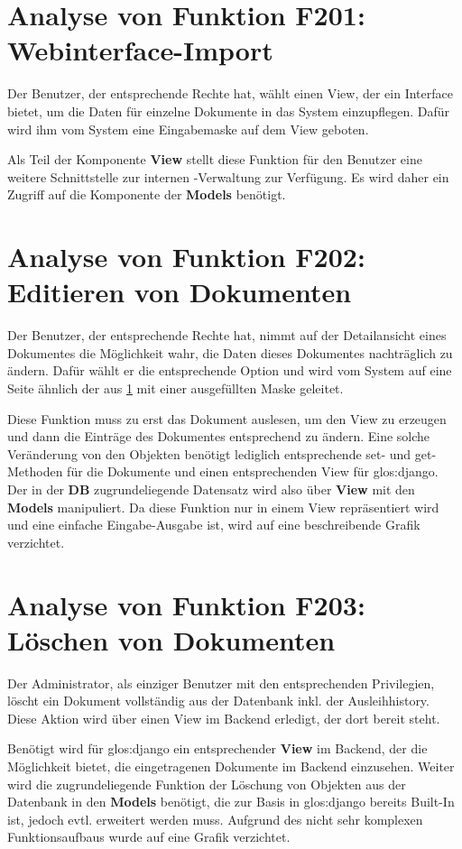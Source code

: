 \section{Analyse von Funktion F201: Webinterface-Import}
\label{f:201}
Der Benutzer, der entsprechende Rechte hat, wählt einen View, der ein Interface
bietet, um die Daten für einzelne Dokumente in das System einzupflegen. Dafür
wird ihm vom System eine Eingabemaske auf dem View geboten.

Als Teil der Komponente \textbf{View} stellt diese Funktion für den
Benutzer eine weitere Schnittstelle zur internen \BibTeX -Verwaltung zur Verfügung. Es wird
daher ein Zugriff auf die Komponente der \textbf{Models} benötigt.

\section{Analyse von Funktion F202: Editieren von Dokumenten}
Der Benutzer, der entsprechende Rechte hat, nimmt auf der Detailansicht eines
Dokumentes die Möglichkeit wahr, die Daten dieses Dokumentes nachträglich zu ändern. Dafür
wählt er die entsprechende Option und wird vom System auf eine Seite ähnlich der
aus \ref{f:201}  mit einer ausgefüllten Maske geleitet.

Diese Funktion muss zu erst das Dokument auslesen, um den View zu erzeugen und
dann die Einträge des Dokumentes entsprechend zu ändern. Eine solche Veränderung
von den Objekten benötigt lediglich entsprechende set- und get-Methoden für die
Dokumente und einen entsprechenden View für \gls{glos:django}. Der in der
\textbf{DB} zugrundeliegende Datensatz wird also über \textbf{View} mit
den \textbf{Models} manipuliert. Da diese Funktion nur in einem View
repräsentiert wird und eine einfache Eingabe-Ausgabe ist, wird auf eine
beschreibende Grafik verzichtet.

\section{Analyse von Funktion F203: Löschen von Dokumenten}
Der Administrator, als einziger Benutzer mit den entsprechenden Privilegien,
löscht ein Dokument vollständig aus der Datenbank inkl. der Ausleihhistory.
Diese Aktion wird über einen View im Backend erledigt, der dort bereit steht.

Benötigt wird für \gls{glos:django} ein entsprechender \textbf{View} im Backend, der die
Möglichkeit bietet, die eingetragenen Dokumente im Backend einzusehen. Weiter
wird die zugrundeliegende Funktion der Löschung von Objekten aus der Datenbank
in den \textbf{Models} benötigt, die zur Basis in \gls{glos:django} bereits Built-In ist,
jedoch evtl. erweitert werden muss. Aufgrund des nicht sehr komplexen
Funktionsaufbaus wurde auf eine Grafik verzichtet.

